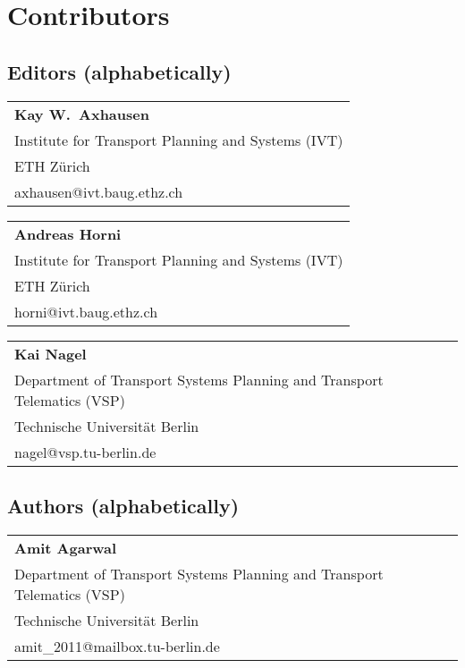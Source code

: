 \chapter*{Contributors}
\section*{Editors (alphabetically)}
\begin{tabular}[width=0.48\textwidth]{l}
\textbf{Kay W.\ Axhausen} \\
Institute for Transport Planning and Systems (IVT) \\
ETH Zürich \\
axhausen@ivt.baug.ethz.ch \\
\end{tabular}

\begin{tabular}[width=0.48\textwidth]{l}
\textbf{Andreas Horni} \\
Institute for Transport Planning and Systems (IVT) \\
ETH Zürich \\
horni@ivt.baug.ethz.ch \\
\end{tabular}

\begin{tabular}[width=0.48\textwidth]{l}
\textbf{Kai Nagel} \\
Department of Transport Systems Planning and Transport Telematics (VSP) \\
Technische Universität Berlin \\
nagel@vsp.tu-berlin.de \\
\end{tabular}

\section*{Authors (alphabetically)}

\begin{tabular}[width=0.48\textwidth]{l}
\textbf{Amit Agarwal} \\
Department of Transport Systems Planning and Transport Telematics (VSP) \\
Technische Universität Berlin \\
amit\_2011@mailbox.tu-berlin.de \\
\end{tabular}

